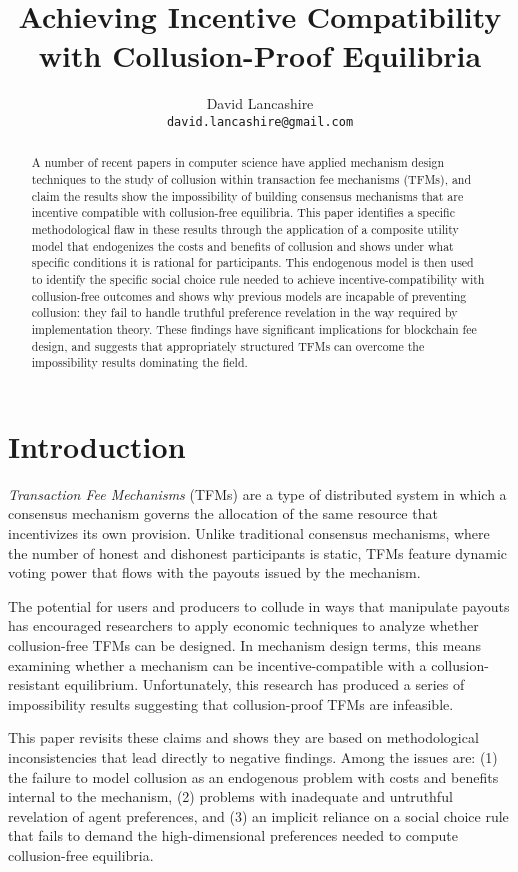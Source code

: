 \documentclass[oneside]{article}   	%
\title{Achieving Incentive Compatibility with Collusion-Proof Equilibria}
\author{
  David Lancashire\\
  \texttt{david.lancashire@gmail.com}\\
}
\begin{document}
\maketitle


\begin{abstract}
A number of recent papers in computer science have applied mechanism design techniques to the study of collusion within transaction fee mechanisms (TFMs), and claim the results show the impossibility of building consensus mechanisms that are incentive compatible with collusion-free equilibria. This paper identifies a specific methodological flaw in these results through the application of a composite utility model that endogenizes the costs and benefits of collusion and shows under what specific conditions it is rational for participants. This endogenous model is then used to identify the specific social choice rule needed to achieve incentive-compatibility with collusion-free outcomes and shows why previous models are incapable of preventing collusion: they fail to handle truthful preference revelation in the way required by implementation theory. These findings have significant implications for blockchain fee design, and suggests that appropriately structured TFMs can overcome the impossibility results dominating the field.
\end{abstract}

\section{Introduction \label{sec::introduction}}

\emph{Transaction Fee Mechanisms} (TFMs) are a type of distributed system in which a consensus mechanism governs the allocation of the same resource that incentivizes its own provision. Unlike traditional consensus mechanisms, where the number of honest and dishonest participants is static, TFMs feature dynamic voting power that flows with the payouts issued by the mechanism.

The potential for users and producers to collude in ways that manipulate payouts has encouraged researchers to apply economic techniques to analyze whether collusion-free TFMs can be designed. In mechanism design terms, this means examining whether a mechanism can be incentive-compatible with a collusion-resistant equilibrium. Unfortunately, this research has produced a series of impossibility results suggesting that collusion-proof TFMs are infeasible.

This paper revisits these claims and shows they are based on methodological inconsistencies that lead directly to negative findings. Among the issues are: (1) the failure to model collusion as an endogenous problem with costs and benefits internal to the mechanism, (2) problems with inadequate and untruthful revelation of agent preferences, and (3) an implicit reliance on a social choice rule that fails to demand the high-dimensional preferences needed to compute collusion-free equilibria.
\end{document}
